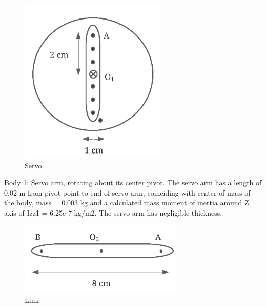 \begin{figure}
\includegraphics[width=0.9\linewidth]{graphics/body1.png}
\caption{Servo}
\label{fig:wrapfig}
\end{figure}

Body 1: Servo arm, rotating about its center pivot. The servo arm has a length of 0.02 m from pivot point to end of servo arm, coinciding with center of mass of the body, mass = 0.003 kg and a calculated mass moment of inertia around Z axis of Izz1 = 6.25e-7 kg/m2. The servo arm has negligible thickness.

\begin{figure}
\includegraphics[width=0.9\linewidth]{graphics/Body3.png}
\caption{Link}
\label{fig:wrapfig}
\end{figure}

